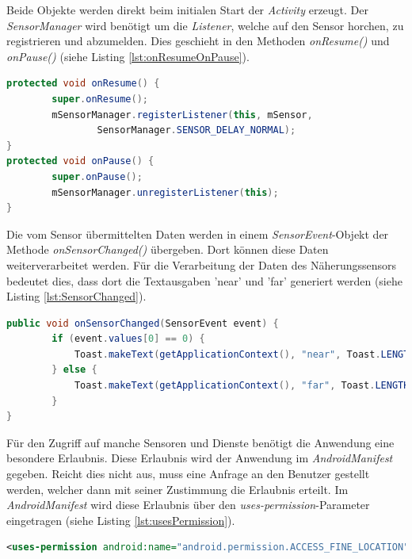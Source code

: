 Beide Objekte werden direkt beim initialen Start der \textit{Activity} erzeugt. Der \textit{SensorManager} wird benötigt um die \textit{Listener}, welche auf den Sensor horchen, zu registrieren und abzumelden. Dies geschieht in den Methoden \textit{onResume()} und \textit{onPause()} (siehe Listing \ref{lst:onResumeOnPause}). 
\clearpage

\begin{lstlisting}[caption=Die Methoden \textit{onResume()} und \textit{onPause()}, label=lst:onResumeOnPause, language=Java]
protected void onResume() {
        super.onResume();
        mSensorManager.registerListener(this, mSensor,
                SensorManager.SENSOR_DELAY_NORMAL);
}
protected void onPause() {
        super.onPause();
        mSensorManager.unregisterListener(this);
}
\end{lstlisting} 

Die vom Sensor übermittelten Daten werden in einem \textit{SensorEvent}-Objekt der Methode \textit{onSensorChanged()} übergeben. Dort können diese Daten weiterverarbeitet werden. Für die Verarbeitung der Daten des Näherungssensors bedeutet dies, dass dort die Textausgaben 'near' und 'far' generiert werden (siehe Listing \ref{lst:SensorChanged}). 

\begin{lstlisting}[caption=Die Methode \textit{onSensorChanged()}, label=lst:SensorChanged, language=Java]
public void onSensorChanged(SensorEvent event) {
        if (event.values[0] == 0) {
            Toast.makeText(getApplicationContext(), "near", Toast.LENGTH_SHORT).show();
        } else {
            Toast.makeText(getApplicationContext(), "far", Toast.LENGTH_SHORT).show();
        }
}
\end{lstlisting} 

Für den Zugriff auf manche Sensoren und Dienste benötigt die Anwendung eine besondere Erlaubnis. Diese Erlaubnis wird der Anwendung im \textit{AndroidManifest} gegeben. Reicht dies nicht aus, muss eine Anfrage an den Benutzer gestellt werden, welcher dann mit seiner Zustimmung die Erlaubnis erteilt. Im \textit{AndroidManifest} wird diese Erlaubnis über den \textit{uses-permission}-Parameter eingetragen (siehe Listing \ref{lst:usesPermission}).

\begin{lstlisting}[caption=Erlaubnis für die Nutzung eines Dienstes im \textit{AndroidManifest}, label=lst:usesPermission, language=XML]
<uses-permission android:name="android.permission.ACCESS_FINE_LOCATION" />
\end{lstlisting}  

